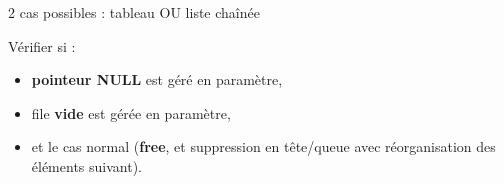\documentclass[11pt,a4paper]{article}
\begin{document}
\bigskip

\begin{center}

\vspace{2cm}

2 cas possibles : tableau OU liste chaînée

\bigskip

Vérifier si :
\begin{itemize}
\item \textbf{pointeur NULL} est géré en paramètre,
\item file \textbf{vide} est gérée en paramètre,
\item et le cas normal (\textbf{free}, et suppression en tête/queue  avec réorganisation des éléments suivant).
\end{itemize}
\end{center}

\bigskip
\end{document}
